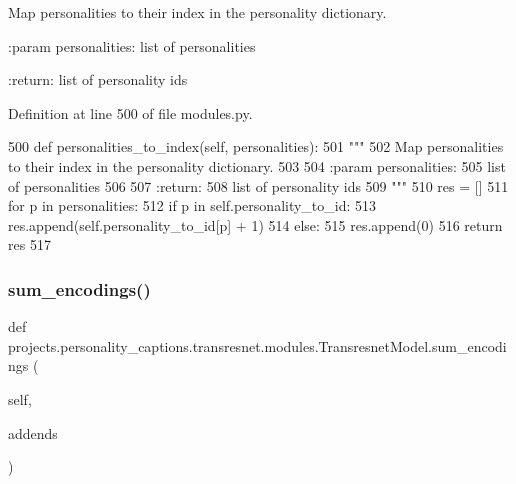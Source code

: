 \begin{DoxyVerb}Map personalities to their index in the personality dictionary.

:param personalities:
    list of personalities

:return:
    list of personality ids
\end{DoxyVerb}
 

Definition at line 500 of file modules.\+py.


\begin{DoxyCode}
500     \textcolor{keyword}{def }personalities\_to\_index(self, personalities):
501         \textcolor{stringliteral}{"""}
502 \textcolor{stringliteral}{        Map personalities to their index in the personality dictionary.}
503 \textcolor{stringliteral}{}
504 \textcolor{stringliteral}{        :param personalities:}
505 \textcolor{stringliteral}{            list of personalities}
506 \textcolor{stringliteral}{}
507 \textcolor{stringliteral}{        :return:}
508 \textcolor{stringliteral}{            list of personality ids}
509 \textcolor{stringliteral}{        """}
510         res = []
511         \textcolor{keywordflow}{for} p \textcolor{keywordflow}{in} personalities:
512             \textcolor{keywordflow}{if} p \textcolor{keywordflow}{in} self.personality\_to\_id:
513                 res.append(self.personality\_to\_id[p] + 1)
514             \textcolor{keywordflow}{else}:
515                 res.append(0)
516         \textcolor{keywordflow}{return} res
517 
\end{DoxyCode}
\mbox{\label{classprojects_1_1personality__captions_1_1transresnet_1_1modules_1_1TransresnetModel_a7e2f89c5290e2b0b13dd0891a07d761d}} 
\subsubsection{\texorpdfstring{sum\+\_\+encodings()}{sum\_encodings()}}
{\footnotesize\ttfamily def projects.\+personality\+\_\+captions.\+transresnet.\+modules.\+Transresnet\+Model.\+sum\+\_\+encodings (\begin{DoxyParamCaption}\item[{}]{self,  }\item[{}]{addends }\end{DoxyParamCaption})}

